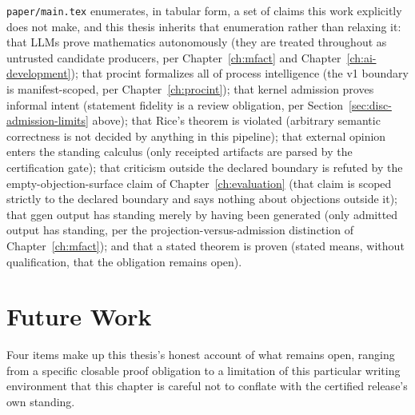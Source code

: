 \texttt{paper/main.tex} enumerates, in tabular form, a set of claims this
work explicitly does not make, and this thesis inherits that enumeration
rather than relaxing it: that LLMs prove mathematics autonomously (they
are treated throughout as untrusted candidate producers, per
Chapter~\ref{ch:mfact} and Chapter~\ref{ch:ai-development}); that
\textsf{procint} formalizes all of process intelligence (the v1 boundary
is manifest-scoped, per Chapter~\ref{ch:procint}); that kernel admission
proves informal intent (statement fidelity is a review obligation, per
Section~\ref{sec:disc-admission-limits} above); that Rice's theorem is
violated (arbitrary semantic correctness is not decided by anything in
this pipeline); that external opinion enters the standing calculus (only
receipted artifacts are parsed by the certification gate); that criticism
outside the declared boundary is refuted by the empty-objection-surface
claim of Chapter~\ref{ch:evaluation} (that claim is scoped strictly to
the declared boundary and says nothing about objections outside it); that
\textsf{ggen} output has standing merely by having been generated (only
admitted output has standing, per the projection-versus-admission
distinction of Chapter~\ref{ch:mfact}); and that a stated theorem is
proven (stated means, without qualification, that the obligation remains
open).

\section{Future Work}
\label{sec:disc-future-work}

Four items make up this thesis's honest account of what remains open,
ranging from a specific closable proof obligation to a limitation of this
particular writing environment that this chapter is careful not to
conflate with the certified release's own standing.

